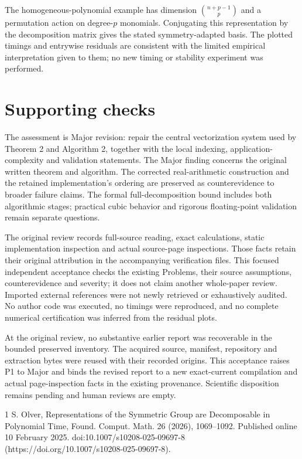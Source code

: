 \documentclass[10pt]{article}
\begin{document}
The homogeneous-polynomial example has dimension \(\binom{n+p-1}{p}\) and a permutation action on degree-\(p\) monomials. Conjugating this representation by the decomposition matrix gives the stated symmetry-adapted basis. The plotted timings and entrywise residuals are consistent with the limited empirical interpretation given to them; no new timing or stability experiment was performed.\par
\section*{Supporting checks}
The assessment is Major revision: repair the central vectorization system used by Theorem 2 and Algorithm 2, together with the local indexing, application-complexity and validation statements. The Major finding concerns the original written theorem and algorithm. The corrected real-arithmetic construction and the retained implementation’s ordering are preserved as counterevidence to broader failure claims. The formal full-decomposition bound includes both algorithmic stages; practical cubic behavior and rigorous floating-point validation remain separate questions.\par
The original review records full-source reading, exact calculations, static implementation inspection and actual source-page inspections. Those facts retain their original attribution in the accompanying verification files. This focused independent acceptance checks the existing Problems, their source assumptions, counterevidence and severity; it does not claim another whole-paper review. Imported external references were not newly retrieved or exhaustively audited. No author code was executed, no timings were reproduced, and no complete numerical certification was inferred from the residual plots.\par
At the original review, no substantive earlier report was recoverable in the bounded preserved inventory. The acquired source, manifest, repository and extraction bytes were reused with their recorded origins. This acceptance raises P1 to Major and binds the revised report to a new exact-current compilation and actual page-inspection facts in the existing provenance. Scientific disposition remains pending and human reviews are empty.\par
1 S. Olver, Representations of the Symmetric Group are Decomposable in Polynomial Time, Found. Comput. Math. 26 (2026), 1069–1092. Published online 10 February 2025. doi:10.1007/s10208-025-09697-8 (https://doi.org/10.1007/s10208-025-09697-8).\par
\end{document}
